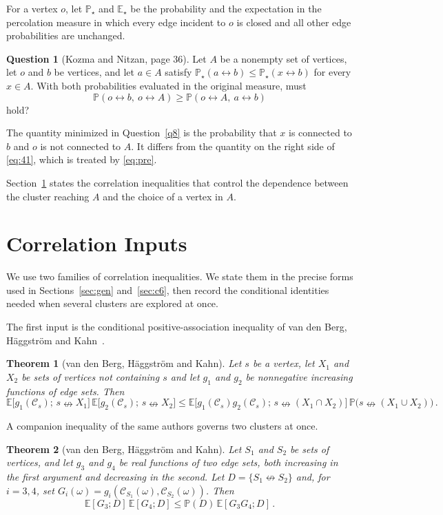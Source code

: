 \documentclass[11pt]{article}
\newtheorem{theorem}{Theorem}[section]
\theoremstyle{definition}
\newtheorem{question}{Question}
\theoremstyle{remark}
\newcommand{\PP}{\mathbb P}
\newcommand{\EE}{\mathbb E}
\newcommand{\con}{\leftrightarrow}
\newcommand{\ncon}{\nleftrightarrow}
\newcommand{\eC}{\mathcal C}
\begin{document}
For a vertex $o$, let $\PP_\star$ and $\EE_\star$ be the probability and the expectation in
the percolation measure in which every edge incident to $o$ is closed and all other edge
probabilities are unchanged.

\begin{question}[Kozma and Nitzan, page 36]\label{q9}
Let $A$ be a nonempty set of vertices, let $o$ and $b$ be vertices, and let $a\in A$
satisfy $\PP_\star(a\con b)\leq\PP_\star(x\con b)$ for every $x\in A$. With both
probabilities evaluated in the
original measure, must
\[
 \PP(o\con b,\ o\con A)\geq \PP(o\con A,\ a\con b)
\]
hold?
\end{question}

The quantity minimized in Question~\ref{q8} is the probability that $x$ is connected to
$b$ and $o$ is not connected to $A$. It differs from the quantity on the right side of
\eqref{eq:41}, which is treated by \eqref{eq:pre}.

Section~\ref{sec:inputs} states the correlation inequalities that control the dependence
between the cluster reaching $A$ and the choice of a vertex in $A$.

\section{Correlation Inputs}\label{sec:inputs}

We use two families of correlation inequalities. We state them in the precise forms used
in Sections~\ref{sec:gen} and~\ref{sec:c6}, then record the conditional identities needed
when several clusters are explored at once.

The first input is the conditional positive-association inequality of van den Berg,
H\"aggstr\"om and Kahn~\cite{BHK}.

\begin{theorem}[van den Berg, H\"aggstr\"om and Kahn]\label{thm:bhk}
Let $s$ be a vertex, let $X_1$ and $X_2$ be sets of vertices not containing $s$ and let
$g_1$ and $g_2$ be nonnegative increasing functions of edge sets. Then
\[
 \EE\bigl[g_1(\eC_s);\,s\ncon X_1\bigr]\,\EE\bigl[g_2(\eC_s);\,s\ncon X_2\bigr]
\leq \EE\bigl[g_1(\eC_s)g_2(\eC_s);\,s\ncon (X_1\cap X_2)\bigr]\,
       \PP\bigl(s\ncon (X_1\cup X_2)\bigr)\,.
\]
\end{theorem}

A companion inequality of the same authors governs two clusters at once.

\begin{theorem}[van den Berg, H\"aggstr\"om and Kahn]\label{thm:bhk2}
Let $S_1$ and $S_2$ be sets of vertices, and let $g_3$ and $g_4$ be real functions of two
edge sets, both increasing in the first argument and decreasing in the second. Let
$D=\{S_1\ncon S_2\}$ and, for $i=3,4$, set
$G_i(\omega)=g_i(\eC_{S_1}(\omega),\eC_{S_2}(\omega))$. Then
\[
 \EE[G_3;D]\,\EE[G_4;D]\leq \PP(D)\,\EE[G_3G_4;D]\,.
\]
\end{theorem}
\end{document}
